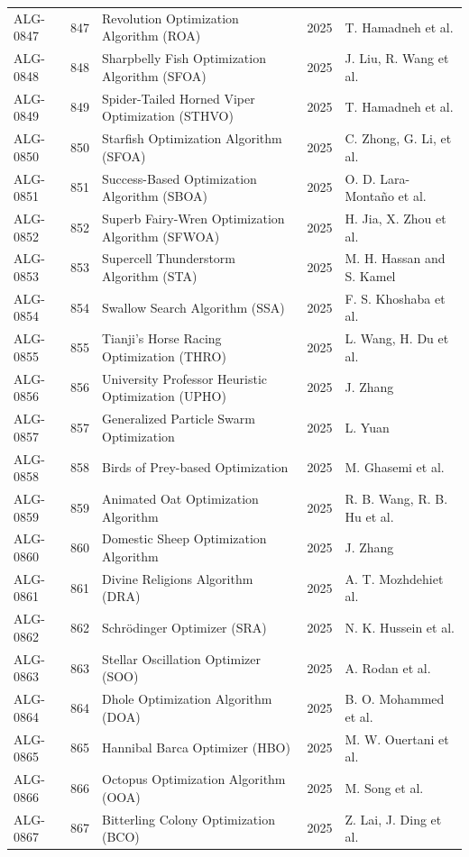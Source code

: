 \documentclass[8pt]{article}
\begin{document}
\begin{landscape}
\begin{longtable}{P{1.7cm}rP{10.0cm}rP{7.2cm}}
ALG-0847 & 847 & Revolution Optimization Algorithm (ROA) & 2025 & T. Hamadneh et al. \\
ALG-0848 & 848 & Sharpbelly Fish Optimization Algorithm (SFOA) & 2025 & J. Liu, R. Wang et al. \\
ALG-0849 & 849 & Spider-Tailed Horned Viper Optimization (STHVO) & 2025 & T. Hamadneh et al. \\
ALG-0850 & 850 & Starfish Optimization Algorithm (SFOA) & 2025 & C. Zhong, G. Li, et al. \\
ALG-0851 & 851 & Success-Based Optimization Algorithm (SBOA) & 2025 & O. D. Lara-Montaño et al. \\
ALG-0852 & 852 & Superb Fairy-Wren Optimization Algorithm (SFWOA) & 2025 & H. Jia, X. Zhou et al. \\
ALG-0853 & 853 & Supercell Thunderstorm Algorithm (STA) & 2025 & M. H. Hassan and S. Kamel \\
ALG-0854 & 854 & Swallow Search Algorithm (SSA) & 2025 & F. S. Khoshaba et al. \\
ALG-0855 & 855 & Tianji's Horse Racing Optimization (THRO) & 2025 & L. Wang, H. Du et al. \\
ALG-0856 & 856 & University Professor Heuristic Optimization (UPHO) & 2025 & J. Zhang \\
ALG-0857 & 857 & Generalized Particle Swarm Optimization & 2025 & L. Yuan \\
ALG-0858 & 858 & Birds of Prey-based Optimization & 2025 & M. Ghasemi et al. \\
ALG-0859 & 859 & Animated Oat Optimization Algorithm & 2025 & R. B. Wang, R. B. Hu et al. \\
ALG-0860 & 860 & Domestic Sheep Optimization Algorithm & 2025 & J. Zhang \\
ALG-0861 & 861 & Divine Religions Algorithm (DRA) & 2025 & A. T. Mozhdehiet al. \\
ALG-0862 & 862 & Schrödinger Optimizer (SRA) & 2025 & N. K. Hussein et al. \\
ALG-0863 & 863 & Stellar Oscillation Optimizer (SOO) & 2025 & A. Rodan et al. \\
ALG-0864 & 864 & Dhole Optimization Algorithm (DOA) & 2025 & B. O. Mohammed et al. \\
ALG-0865 & 865 & Hannibal Barca Optimizer (HBO) & 2025 & M. W. Ouertani et al. \\
ALG-0866 & 866 & Octopus Optimization Algorithm (OOA) & 2025 & M. Song et al. \\
ALG-0867 & 867 & Bitterling Colony Optimization (BCO) & 2025 & Z. Lai, J. Ding et al. \\

\end{longtable}
\end{landscape}
\end{document}
